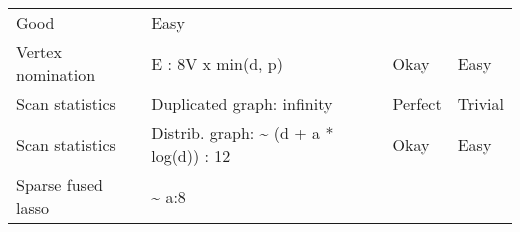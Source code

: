 \documentclass[10pt,oneside]{memoir}
\begin{document}
\begin{longtable}[]{@{}llll@{}}
\begin{minipage}[t]{0.13\columnwidth}
Good\strut
\end{minipage} & \begin{minipage}[t]{0.13\columnwidth}\raggedright
Easy\strut
\end{minipage}\tabularnewline
\begin{minipage}[t]{0.28\columnwidth}\raggedright
Vertex nomination\strut
\end{minipage} & \begin{minipage}[t]{0.35\columnwidth}\raggedright
E : 8V x min(d, p)\strut
\end{minipage} & \begin{minipage}[t]{0.13\columnwidth}\raggedright
Okay\strut
\end{minipage} & \begin{minipage}[t]{0.13\columnwidth}\raggedright
Easy\strut
\end{minipage}\tabularnewline
\begin{minipage}[t]{0.28\columnwidth}\raggedright
Scan statistics\strut
\end{minipage} & \begin{minipage}[t]{0.35\columnwidth}\raggedright
Duplicated graph: infinity\strut
\end{minipage} & \begin{minipage}[t]{0.13\columnwidth}\raggedright
Perfect\strut
\end{minipage} & \begin{minipage}[t]{0.13\columnwidth}\raggedright
Trivial\strut
\end{minipage}\tabularnewline
\begin{minipage}[t]{0.28\columnwidth}\raggedright
Scan statistics\strut
\end{minipage} & \begin{minipage}[t]{0.35\columnwidth}\raggedright
Distrib. graph: \textasciitilde{} (d + a * log(d)) : 12\strut
\end{minipage} & \begin{minipage}[t]{0.13\columnwidth}\raggedright
Okay\strut
\end{minipage} & \begin{minipage}[t]{0.13\columnwidth}\raggedright
Easy\strut
\end{minipage}\tabularnewline
\begin{minipage}[t]{0.28\columnwidth}\raggedright
Sparse fused lasso\strut
\end{minipage} & \begin{minipage}[t]{0.35\columnwidth}\raggedright
\textasciitilde{} a:8\strut
\end{minipage} & \begin{minipage}[t]{0.13\columnwidth}\raggedright

\end{minipage}
\end{longtable}
\end{document}
